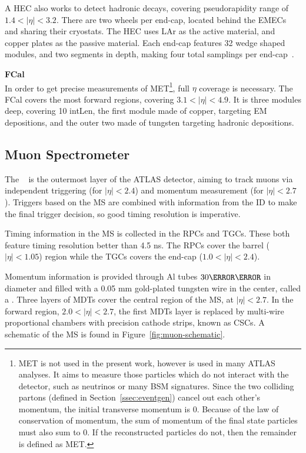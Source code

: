 A \gls{HEC} also works to detect hadronic decays, covering pseudorapidity range of $1.4 < |\eta| < 3.2$. There are two wheels per end-cap, located behind the \glspl{EMEC} and sharing their cryostats. The \gls{HEC} uses \gls{LAr} as the active material, and copper plates as the passive material. Each end-cap features 32 wedge shaped modules, and two segments in depth, making four total samplings per end-cap~\cite{lar-tdr}.


\noindent\textbf{\gls{FCal}}\\
\indent In order to get precise measurements of \gls{MET}\footnote{\gls{MET} is not used in the present work, however is used in many ATLAS analyses. It aims to measure those particles which do not interact with the detector, such as neutrinos or many \gls{BSM} signatures. Since the two colliding partons (defined in Section~\ref{ssec:eventgen}) cancel out each other's momentum, the initial transverse momentum is 0. Because of the law of conservation of momentum, the sum of momentum of the final state particles must also sum to 0. If the reconstructed particles do not, then the remainder is defined as \gls{MET}.}, full $\eta$ coverage is necessary. The \gls{FCal} covers the most forward regions, covering $3.1 < |\eta| < 4.9$. It is three modules deep, covering 10 \gls{intLen}, the first module made of copper, targeting \gls{EM} depositions, and the outer two made of tungsten targeting hadronic depositions.


\subsection{Muon Spectrometer}\label{ssec:muonspectrometer}
The ~\cite{muon-tdr} is the outermost layer of the ATLAS detector, aiming to track muons via independent triggering (for $|\eta| < 2.4$) and momentum measurement (for $|\eta| < 2.7$). Triggers based on the \gls{MS} are combined with information from the \gls{ID} to make the final trigger decision, so good timing resolution is imperative.

Timing information in the \gls{MS} is collected in the \glspl{RPC} and \glspl{TGC}. These both feature timing resolution better than 4.5 ns. The \glspl{RPC} cover the barrel ($|\eta| < 1.05$) region while the \glspl{TGC} covers the end-cap ($1.0<|\eta|<2.4$).


Momentum information is provided through Al tubes $\unit{30}{\milli\meter}$ in diameter and filled with a 0.05 mm gold-plated tungsten wire in the center, called a . Three layers of \glspl{MDT} cover the central region of the \gls{MS}, at $|\eta| < 2.7$. In the forward region, $2.0<|\eta|<2.7$, the first \glspl{MDT} layer is replaced by multi-wire proportional chambers with precision cathode strips, known as \glspl{CSC}. A schematic of the \gls{MS} is found in Figure~\ref{fig:muon-schematic}.


